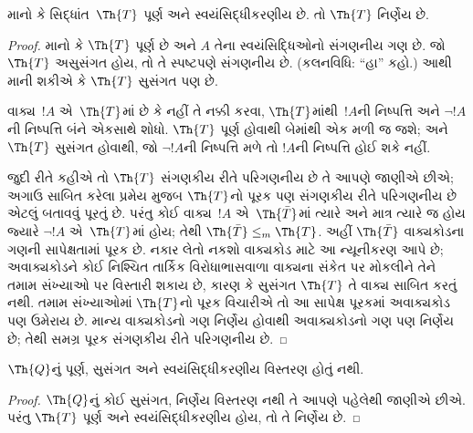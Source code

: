 \begin{lem}
માનો કે સિદ્ધાંત~$\Th{T}$
પૂર્ણ અને સ્વયંસિદ્ધીકરણીય છે.
તો $\Th{T}$ નિર્ણેય છે.
\end{lem}

\begin{proof}
માનો કે $\Th{T}$ પૂર્ણ છે
અને $A$ તેના સ્વયંસિદ્ધિઓનો
સંગણનીય ગણ છે.
જો $\Th{T}$ અસુસંગત હોય,
તો તે સ્પષ્ટપણે સંગણનીય છે.
(કલનવિધિ: ``હા'' કહો.)
આથી માની શકીએ કે
$\Th{T}$ સુસંગત પણ છે.

વાક્ય~$!A$ એ~$\Th{T}$માં
છે કે નહીં તે નક્કી કરવા,
$\Th{T}$માંથી~$!A$ની
નિષ્પત્તિ અને
$\lnot !A$ની નિષ્પત્તિ
બંને એકસાથે શોધો.
$\Th{T}$ પૂર્ણ હોવાથી
બેમાંથી એક મળી જ જશે;
અને $\Th{T}$ સુસંગત હોવાથી,
જો $\lnot !A$ની
નિષ્પત્તિ મળે તો
$!A$ની નિષ્પત્તિ
હોઈ શકે નહીં.

જુદી રીતે કહીએ તો
$\Th{T}$ સંગણકીય રીતે પરિગણનીય છે
તે આપણે જાણીએ છીએ;
અગાઉ સાબિત કરેલા પ્રમેય
મુજબ $\Th{T}$નો પૂરક પણ
સંગણકીય રીતે પરિગણનીય છે એટલું
બતાવવું પૂરતું છે.
પરંતુ કોઈ વાક્ય~$!A$ એ~$\Th{\bar
T}$માં ત્યારે અને માત્ર
ત્યારે જ હોય જ્યારે
$\lnot !A$ એ~$\Th{T}$માં
હોય; તેથી
$\Th{\bar T} \leq_m
\Th{T}$.
અહીં $\Th{\bar T}$ વાક્યકોડના ગણની સાપેક્ષતામાં
પૂરક છે. નકાર લેતો નકશો વાક્યકોડ માટે આ ન્યૂનીકરણ આપે છે;
અવાક્યકોડને કોઈ નિશ્ચિત તાર્કિક વિરોધાભાસવાળા વાક્યના સંકેત પર મોકલીને
તેને તમામ સંખ્યાઓ પર વિસ્તારી શકાય છે, કારણ કે
સુસંગત $\Th{T}$ તે વાક્ય સાબિત કરતું નથી.
તમામ સંખ્યાઓમાં $\Th{T}$નો પૂરક વિચારીએ તો
આ સાપેક્ષ પૂરકમાં અવાક્યકોડ પણ ઉમેરાય છે.
માન્ય વાક્યકોડનો ગણ નિર્ણેય હોવાથી અવાક્યકોડનો ગણ પણ
નિર્ણેય છે; તેથી સમગ્ર પૂરક સંગણકીય રીતે પરિગણનીય છે.
\end{proof}
\endgroup


\begingroup
\makeatletter{}\makeatother


\label{guunit:OLP-0308}


\begin{thm}
$\Th{Q}$નું પૂર્ણ, સુસંગત અને
સ્વયંસિદ્ધીકરણીય વિસ્તરણ
હોતું નથી.
\end{thm}

\begin{proof}
$\Th{Q}$નું કોઈ સુસંગત,
નિર્ણેય વિસ્તરણ નથી
તે આપણે પહેલેથી જાણીએ છીએ.
પરંતુ $\Th{T}$ પૂર્ણ અને
સ્વયંસિદ્ધીકરણીય હોય,
તો તે નિર્ણેય છે.
\end{proof}

